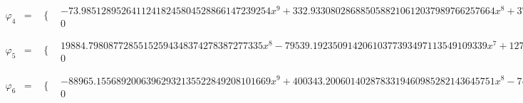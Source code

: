 \documentclass{article}
\begin{document}
\begin{landscape}
\begin{eqnarray*}
\begin{array}{cc}
\end{array}\\
\varphi_4 & = & \begin{array}{cc}
 \{ & 
\begin{array}{cc}
 -73.98512895264112418245804528866147239254 x^9+332.9330802868850588210612037989766257664 x^8+3710.795599736546392723693461356022749794 x^7-14541.47230708337598236454606580797054452 x^6+19971.03072894209449284142441724552927986 x^5-12797.05220064406447227638640306295137821 x^4+3813.220865059794948219055605067853898127 x^3-415.4706373452393137818441733087991584149 x^2 & x\geq 0\land x<1 \\
 0 & \text{True}
\end{array}

\end{array}\\
\varphi_5 & = & \begin{array}{cc}
 \{ & 
\begin{array}{cc}
 19884.79808772855152594348374278387277335 x^8-79539.19235091420610377393497113549109339 x^7+127188.3551192742326741492231919878629237 x^6-103177.8921296229766592388971769893699443 x^5+44271.55798601671355468265361337996298033 x^4-9375.686832061706465036736064769048995732 x^3+748.0601195793914732742076647422113560425 x^2 & x\geq 0\land x<1 \\
 0 & \text{True}
\end{array}

\end{array}\\
\varphi_6 & = & \begin{array}{cc}
 \{ & 
\begin{array}{cc}
 -88965.15568920063962932135522849208101669 x^9+400343.2006014028783319460985282143645751 x^8-743124.3846796878691282891868664850809416 x^7+732667.0769056941097332636942343640819449 x^6-410826.2155411272632987943052774292518924 x^5+129531.9813251896000217007575068297755443 x^4-20934.81403534729602505454635624433881675 x^3+1308.311113076479994548843459242530603187 x^2 & x\geq 0\land x<1 \\
 0 & \text{True}
\end{array}


\end{array}
\end{eqnarray*}
\end{landscape}
\end{document}

